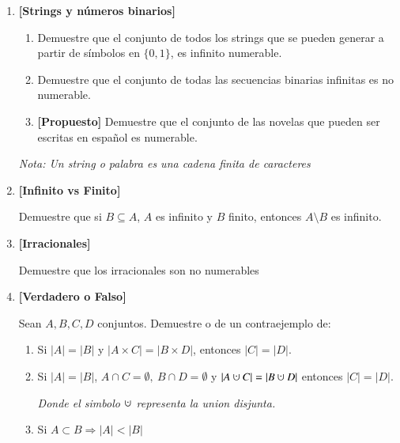 \documentclass[letterpaper,11pt]{article}
\theoremstyle{plain}
\newcommand{\cupdot}{\mathbin{\mathaccent\cdot\cup}}
\begin{document}
\begin{enumerate}[\bf P1.]
    \item \textbf{[Strings y números binarios]}
        
        \begin{enumerate}
            \item Demuestre que el conjunto de todos los strings que se pueden generar a partir de símbolos en $\{0,1\}$, es infinito numerable.
            \item Demuestre que el conjunto de todas las secuencias binarias infinitas es no numerable. %
            \item \textbf{[Propuesto]} Demuestre que el conjunto de las novelas que pueden ser escritas en español es numerable.
        \end{enumerate}
    \textit{Nota: Un string o palabra es una cadena finita de caracteres}
    
    \item \textbf{[Infinito vs Finito]} 
    
    Demuestre que si $B\subseteq A$, $A$ es infinito y $B$ finito, entonces $A\setminus B$ es infinito. %
    
    \item \textbf{[Irracionales]}
    
    Demuestre que los irracionales son no numerables
    
    \item \textbf{[Verdadero o Falso]}
    
    Sean $A,B,C,D$ conjuntos. Demuestre o de un contraejemplo de:
        \begin{enumerate}
            \item Si $|A|=|B|$ y $|A\times C|=|B\times D|$, entonces $|C|=|D|$. %
            \item Si $|A|=|B|$, $A\cap C=\emptyset,~ B\cap D=\emptyset$ y $|A\cupdot C|=|B\cupdot D|$ entonces $|C|=|D|$.
            
            \textit{Donde el simbolo $\cupdot$ representa la union disjunta.}
            \item Si $A\subset B \Longrightarrow |A|<|B|$ 
            

\end{enumerate}
\end{enumerate}
\end{document}
